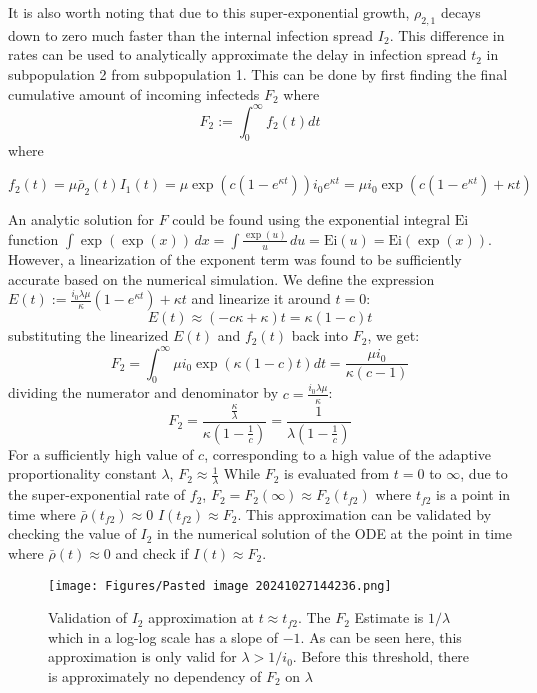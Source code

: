 \documentclass{article}
\begin{document}
It is also worth noting that due to this super-exponential growth, $\rho_{2,1}$ decays down to zero much faster than the internal infection spread $I_2$. This difference in rates can be used to analytically approximate the delay in infection spread $t_2$ in subpopulation 2 from subpopulation 1. This can be done by first finding the final cumulative amount of incoming infecteds $F_2$ where 
$$F_2:=\int_0^\infty f_2(t)dt$$
where 

$$f_2(t)=\mu \bar \rho_2(t) I_1(t) = \mu \exp\left({c \left( 1 - e^{\kappa t} \right)}\right)i_0 e^{\kappa t} = \mu i_0 \exp\left({c \left( 1 - e^{\kappa t} \right)} +\kappa t\right)$$

An analytic solution for $F$ could be found using the exponential integral $\mathrm{Ei}$ function  $\int\exp(\exp(x))\,d x=\int{\frac{\exp(u)}{u}}\,d u={\mathrm{Ei}}(u)={\mathrm{Ei}}(\exp(x))$. However, a linearization of the exponent term was found to be sufficiently accurate based on the numerical simulation. We define the expression $E(t):=\frac{i_{0} \lambda \mu}{\kappa} \left( 1 - e^{\kappa t} \right)+\kappa t$ and linearize it around $t=0$: 
$$E(t)\approx (-c\kappa+\kappa)t = \kappa (1-c) t$$
substituting the linearized $E(t)$ and $f_2(t)$ back into $F_2$, we get:
$$F_2=\int_0^\infty \mu i_0 \exp\left(\kappa (1-c) t \right) dt = \frac{\mu i_0}{\kappa(c-1)}$$
dividing the numerator and denominator by $c=\frac{i_{0} \lambda \mu}{\kappa}$:
$$F_2=\frac{\frac{\kappa}{\lambda}}{\kappa\left( 1-\frac{1}{c} \right)}=\frac{1}{\lambda\left( 1-\frac{1}{c} \right)} $$
For a sufficiently high value of $c$, corresponding to a high value of the adaptive proportionality constant $\lambda$, $F_2\approx\frac{1}{\lambda}$
While $F_2$ is evaluated from $t=0$ to $\infty$, due to the super-exponential rate of $f_2$, $F_2=F_2(\infty)\approx F_2(t_{f2})$ where $t_{f2}$ is a point in time where $\bar\rho(t_{f2})\approx 0$  $I({t_{f2}})\approx F_2$. This approximation can be validated by checking the value of $I_2$ in the numerical solution of the ODE at the point in time where $\bar\rho(t)\approx 0$ and check if $I(t)\approx F_2$. 

\begin{figure}[h!]
    \centering
    \texttt{[image: Figures/Pasted image 20241027144236.png]}
    \caption{\small Validation of $I_2$ approximation at $t \approx t_{f2}$. The $F_2$ Estimate is $1/\lambda$ which in a log-log scale has a slope of $-1$. As can be seen here, this approximation is only valid for $\lambda>1/i_0$. Before this threshold, there is approximately no dependency of $F_2$ on $\lambda$ }

\end{figure}
\end{document}
